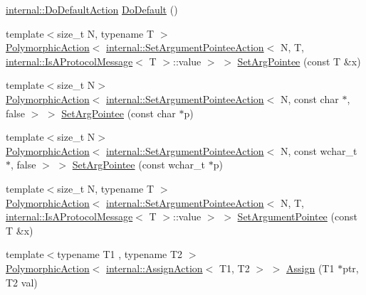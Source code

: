 \begin{DoxyCompactItemize}
\item 
\hyperlink{classtesting_1_1internal_1_1DoDefaultAction}{internal\+::\+Do\+Default\+Action} \hyperlink{namespacetesting_ae041df61ff61ccb9753ba15b4309e1a6}{Do\+Default} ()
\item 
{\footnotesize template$<$size\+\_\+t N, typename T $>$ }\\\hyperlink{classtesting_1_1PolymorphicAction}{Polymorphic\+Action}$<$ \hyperlink{classtesting_1_1internal_1_1SetArgumentPointeeAction}{internal\+::\+Set\+Argument\+Pointee\+Action}$<$ N, T, \hyperlink{structtesting_1_1internal_1_1IsAProtocolMessage}{internal\+::\+Is\+A\+Protocol\+Message}$<$ T $>$\+::value $>$ $>$ \hyperlink{namespacetesting_a5740a5033b88c37666fcd09a269d123f}{Set\+Arg\+Pointee} (const T \&x)
\item 
{\footnotesize template$<$size\+\_\+t N$>$ }\\\hyperlink{classtesting_1_1PolymorphicAction}{Polymorphic\+Action}$<$ \hyperlink{classtesting_1_1internal_1_1SetArgumentPointeeAction}{internal\+::\+Set\+Argument\+Pointee\+Action}$<$ N, const char $\ast$, false $>$ $>$ \hyperlink{namespacetesting_a4a190fd2d02fb7cd79c5b3df3f80b647}{Set\+Arg\+Pointee} (const char $\ast$p)
\item 
{\footnotesize template$<$size\+\_\+t N$>$ }\\\hyperlink{classtesting_1_1PolymorphicAction}{Polymorphic\+Action}$<$ \hyperlink{classtesting_1_1internal_1_1SetArgumentPointeeAction}{internal\+::\+Set\+Argument\+Pointee\+Action}$<$ N, const wchar\+\_\+t $\ast$, false $>$ $>$ \hyperlink{namespacetesting_ac128085b4a8d64563fd5ccef324ea177}{Set\+Arg\+Pointee} (const wchar\+\_\+t $\ast$p)
\item 
{\footnotesize template$<$size\+\_\+t N, typename T $>$ }\\\hyperlink{classtesting_1_1PolymorphicAction}{Polymorphic\+Action}$<$ \hyperlink{classtesting_1_1internal_1_1SetArgumentPointeeAction}{internal\+::\+Set\+Argument\+Pointee\+Action}$<$ N, T, \hyperlink{structtesting_1_1internal_1_1IsAProtocolMessage}{internal\+::\+Is\+A\+Protocol\+Message}$<$ T $>$\+::value $>$ $>$ \hyperlink{namespacetesting_a03b315d27c91a8e719f2b6c09964130b}{Set\+Argument\+Pointee} (const T \&x)
\item 
{\footnotesize template$<$typename T1 , typename T2 $>$ }\\\hyperlink{classtesting_1_1PolymorphicAction}{Polymorphic\+Action}$<$ \hyperlink{classtesting_1_1internal_1_1AssignAction}{internal\+::\+Assign\+Action}$<$ T1, T2 $>$ $>$ \hyperlink{namespacetesting_abfc4121b8708e8b22a096ff8be88a9d0}{Assign} (T1 $\ast$ptr, T2 val)

\end{DoxyCompactItemize}
